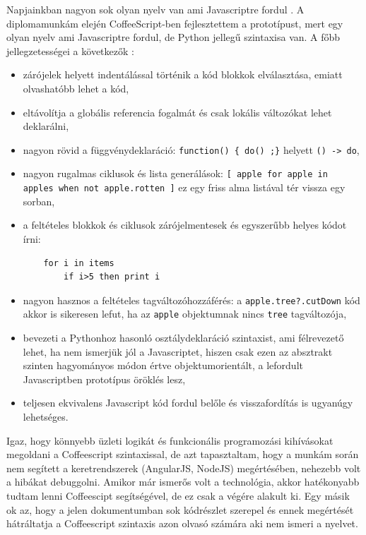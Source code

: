 Napjainkban nagyon sok olyan nyelv van ami Javascriptre fordul \cite{coffeeref}. A diplomamunkám elején CoffeeScript-ben fejlesztettem a prototípust, mert egy olyan nyelv ami Javascriptre fordul, de Python jellegű szintaxisa van. A főbb jellegzetességei a következők \cite{maccaw2011}:

\begin{itemize}
\item zárójelek helyett indentálással történik a kód blokkok elválasztása, emiatt olvashatóbb lehet a kód,
\item eltávolítja a globális referencia fogalmát és csak lokális változókat lehet deklarálni,
\item nagyon rövid a függvénydeklaráció: \lstinline|function() { do() ;}| helyett \lstinline{() -> do},
\item nagyon rugalmas ciklusok és lista generálások: \lstinline{[ apple for apple in apples when not apple.rotten ]} ez egy friss alma listával tér vissza egy sorban, 
\item a feltételes blokkok és ciklusok zárójelmentesek és egyszerűbb helyes kódot írni: \begin{lstlisting}
    for i in items
        if i>5 then print i
        \end{lstlisting}
\item nagyon hasznos a feltételes tagváltozóhozzáférés: a \lstinline{apple.tree?.cutDown} kód akkor is sikeresen lefut, ha az \lstinline{apple} objektumnak nincs \lstinline{tree} tagváltozója,
\item bevezeti a Pythonhoz hasonló osztálydeklaráció szintaxist, ami félrevezető lehet, ha nem ismerjük jól a Javascriptet, hiszen csak ezen az absztrakt szinten hagyományos módon értve objektumorientált, a lefordult Javascriptben prototípus öröklés lesz,
\item teljesen ekvivalens Javascript kód fordul belőle és visszafordítás is ugyanúgy lehetséges.
\end{itemize}

Igaz, hogy könnyebb üzleti logikát és funkcionális programozási kihívásokat megoldani a Coffeescript szintaxissal, de azt tapasztaltam, hogy a munkám során nem segített a keretrendszerek (AngularJS, NodeJS) megértésében, nehezebb volt a hibákat debuggolni. Amikor már ismerős volt a technológia, akkor hatékonyabb tudtam lenni Coffeescipt segítségével, de ez csak a végére alakult ki. Egy másik ok az, hogy a jelen dokumentumban sok kódrészlet szerepel és ennek megértését hátráltatja a Coffeescript szintaxis azon olvasó számára aki nem ismeri a nyelvet. 


